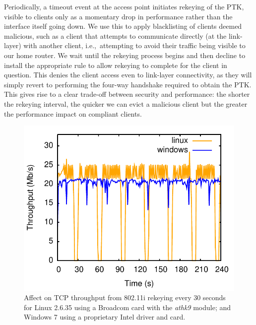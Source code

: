 Periodically, a timeout event at the access point initiates rekeying of the PTK,
visible to clients only as a momentary drop in performance rather than the
interface itself going down.  We use this to apply blacklisting of clients
deemed malicious, such as a client that attempts to communicate directly (at the
link-layer) with another client, i.e.,~attempting to avoid their traffic being visible
to our home router.  We wait until the rekeying process begins and then decline
to install the appropriate rule to allow rekeying to complete for the client in
question.  This denies the client access even to link-layer connectivity, as
they will simply revert to performing the four-way handshake required to obtain
the PTK\@.  This gives rise to a clear trade-off between security and performance:
the shorter the rekeying interval, the quicker we can evict a malicious client
but the greater the performance impact on compliant clients.  

\begin{figure} 
  \centering 
  \includegraphics[width=0.5\columnwidth]{Chapter2/Chapter2Figs/rekeying}
  \caption[Affect on TCP throughput from 802.11i rekeying]
  {\label{f:rekeying}Affect on TCP throughput from 802.11i rekeying every 30 seconds
      for Linux 2.6.35 using a Broadcom card with the \emph{athk9} module; and
      Windows 7 using a proprietary Intel driver and card.} 
\end{figure}

